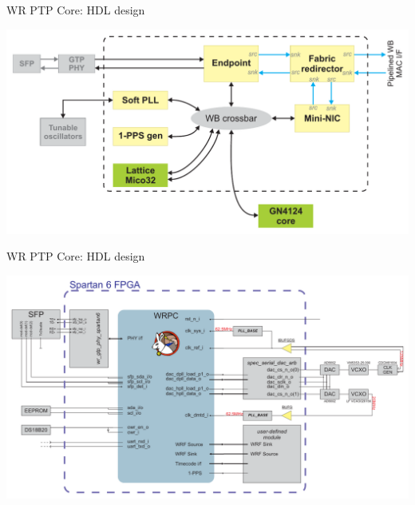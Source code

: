 \documentclass[compress,red]{beamer}
\newcommand{\backupend}{
   \addtocounter{framenumberappendix}{-\value{framenumber}}
   \addtocounter{framenumber}{\value{framenumberappendix}} 
}
\begin{document}
\begin{frame}{WR PTP Core: HDL design}
	\begin{center}
	\includegraphics[width=\textwidth]{node/wrpc_inside_simple.pdf}
	\end{center}
\end{frame}
\begin{frame}{WR PTP Core: HDL design}
	\begin{center}
	\includegraphics[width=\textwidth]{node/wrpc_basic_top.pdf}
	\end{center}
\end{frame}


\backupend

\end{document}
